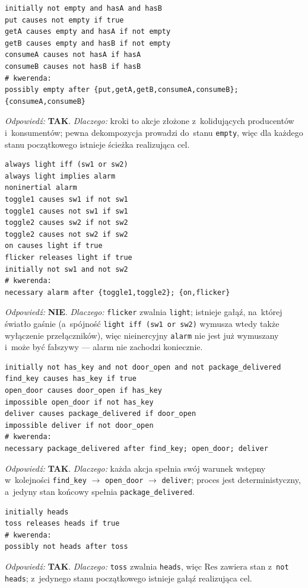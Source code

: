 \documentclass[11pt,a4paper]{article}
\newcommand{\Res}{\mathrm{Res}}
\begin{document}
\begin{lstlisting}[style=ds4code, caption={Producent--konsument (rodzina tex)}]
initially not empty and hasA and hasB
put causes not empty if true
getA causes empty and hasA if not empty
getB causes empty and hasB if not empty
consumeA causes not hasA if hasA
consumeB causes not hasB if hasB
# kwerenda:
possibly empty after {put,getA,getB,consumeA,consumeB}; {consumeA,consumeB}
\end{lstlisting}
\emph{Odpowiedź:} \textbf{TAK}. \emph{Dlaczego:} kroki to akcje złożone
z~kolidujących producentów i~konsumentów; pewna dekompozycja prowadzi do~stanu
\texttt{empty}, więc dla każdego stanu początkowego istnieje ścieżka realizująca
cel.

\begin{lstlisting}[style=ds4code, caption={Dwa przełączniki --- ramifikacja i~zwolnienie (rodzina tex)}]
always light iff (sw1 or sw2)
always light implies alarm
noninertial alarm
toggle1 causes sw1 if not sw1
toggle1 causes not sw1 if sw1
toggle2 causes sw2 if not sw2
toggle2 causes not sw2 if sw2
on causes light if true
flicker releases light if true
initially not sw1 and not sw2
# kwerenda:
necessary alarm after {toggle1,toggle2}; {on,flicker}
\end{lstlisting}
\emph{Odpowiedź:} \textbf{NIE}. \emph{Dlaczego:} \texttt{flicker} zwalnia
\texttt{light}; istnieje gałąź, na~której światło gaśnie (a~spójność
\texttt{light iff (sw1 or sw2)} wymusza wtedy także wyłączenie przełączników),
więc nieinercyjny \texttt{alarm} nie jest już wymuszany i~może być fałszywy ---
alarm nie zachodzi koniecznie.

\begin{lstlisting}[style=ds4code, caption={Robot dostawczy --- proces wieloetapowy (rodzina scenario)}]
initially not has_key and not door_open and not package_delivered
find_key causes has_key if true
open_door causes door_open if has_key
impossible open_door if not has_key
deliver causes package_delivered if door_open
impossible deliver if not door_open
# kwerenda:
necessary package_delivered after find_key; open_door; deliver
\end{lstlisting}
\emph{Odpowiedź:} \textbf{TAK}. \emph{Dlaczego:} każda akcja spełnia swój warunek
wstępny w~kolejności \texttt{find\_key} $\to$ \texttt{open\_door} $\to$
\texttt{deliver}; proces jest deterministyczny, a~jedyny stan końcowy spełnia
\texttt{package\_delivered}.

\begin{lstlisting}[style=ds4code, caption={Rzut monetą --- niedeterminizm przez releases (rodzina scenario)}]
initially heads
toss releases heads if true
# kwerenda:
possibly not heads after toss
\end{lstlisting}
\emph{Odpowiedź:} \textbf{TAK}. \emph{Dlaczego:} \texttt{toss} zwalnia
\texttt{heads}, więc $\Res$ zawiera stan z~\texttt{not heads}; z~jedynego stanu
początkowego istnieje gałąź realizująca cel.
\end{document}
